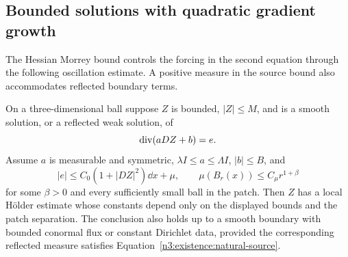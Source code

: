 \subsection{Bounded solutions with quadratic gradient growth}

The Hessian Morrey bound controls the forcing in the second equation
through the following oscillation estimate. A positive measure in the
source bound also accommodates reflected boundary terms.

\begin{lemma}
\label{n3:existence:natural-growth}
On a three-dimensional ball suppose $Z$ is bounded, $|Z|\le M$,
and is a smooth solution, or a reflected weak solution, of
\begin{equation}\label{n3:existence:natural-equation}
 \operatorname{div}(aDZ+b)=e.
\end{equation}
Assume $a$ is measurable and symmetric,
$\lambda I\le a\le\Lambda I$, $|b|\le B$, and
\begin{equation}\label{n3:existence:natural-source}
 |e|\le C_0(1+|DZ|^2)\dd x+\mu,\qquad
 \mu(B_r(x))\le C_\mu r^{1+\beta}
\end{equation}
for some $\beta>0$ and every sufficiently small ball in the patch.
Then $Z$ has a local H\"older estimate whose constants depend only
on the displayed bounds and the patch separation.  The conclusion
also holds up to a smooth boundary with bounded conormal flux or
constant Dirichlet data, provided the corresponding reflected
measure satisfies Equation~\eqref{n3:existence:natural-source}.
\end{lemma}

